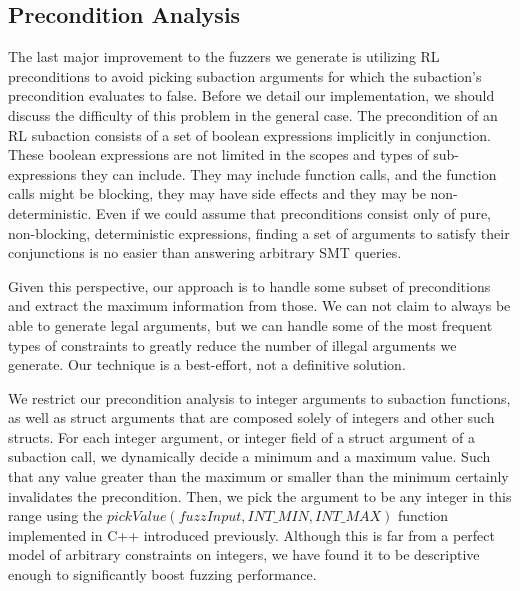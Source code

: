 \subsection{Precondition Analysis}
The last major improvement to the fuzzers we generate is utilizing RL preconditions to avoid picking subaction arguments for which the subaction's precondition evaluates to false.
Before we detail our implementation, we should discuss the difficulty of this problem in the general case.
The precondition of an RL subaction consists of a set of boolean expressions implicitly in conjunction.
These boolean expressions are not limited in the scopes and types of sub-expressions they can include.
They may include function calls, and the function calls might be blocking, they may have side effects and they may be non-deterministic.
Even if we could assume that preconditions consist only of pure, non-blocking, deterministic expressions, finding a set of arguments to satisfy their conjunctions is no easier than answering arbitrary SMT queries.

Given this perspective, our approach is to handle some subset of preconditions and extract the maximum information from those.
We can not claim to always be able to generate legal arguments, but we can handle some of the most frequent types of constraints to greatly reduce the number of illegal arguments we generate.
Our technique is a best-effort, not a definitive solution.

We restrict our precondition analysis to integer arguments to subaction functions, as well as struct arguments that are composed solely of integers and other such structs.
For each integer argument, or integer field of a struct argument of a subaction call, we dynamically decide a minimum and a maximum value.
Such that any value greater than the maximum or smaller than the minimum certainly invalidates the precondition.
Then, we pick the argument to be any integer in this range using the $pickValue(fuzzInput, INT\_MIN, INT\_MAX)$ function implemented in C++ introduced previously.
Although this is far from a perfect model of arbitrary constraints on integers, we have found it to be descriptive enough to significantly boost fuzzing performance.

